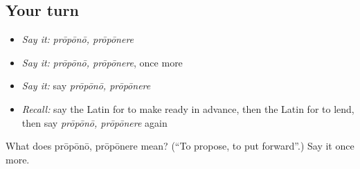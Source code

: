 \subsection*{Your turn}
\begin{itemize}
\raggedright
  \item \emph{Say it:} \emph{prōpōnō, prōpōnere}
  \item \emph{Say it:} \emph{prōpōnō, prōpōnere}, once more
  \item \emph{Say it:} say \emph{prōpōnō, prōpōnere}
  \item \emph{Recall:} say the Latin for to make ready in advance, then the Latin for to lend, then say \emph{prōpōnō, prōpōnere} again
\end{itemize}

\begin{tcolorbox}[breakable,colback=teal!4,colframe=teal!35!black,title={Before you move on}]
What does prōpōnō, prōpōnere mean? (\textquotedblleft{}To propose, to put forward\textquotedblright{}.) Say it once more.
\end{tcolorbox}
